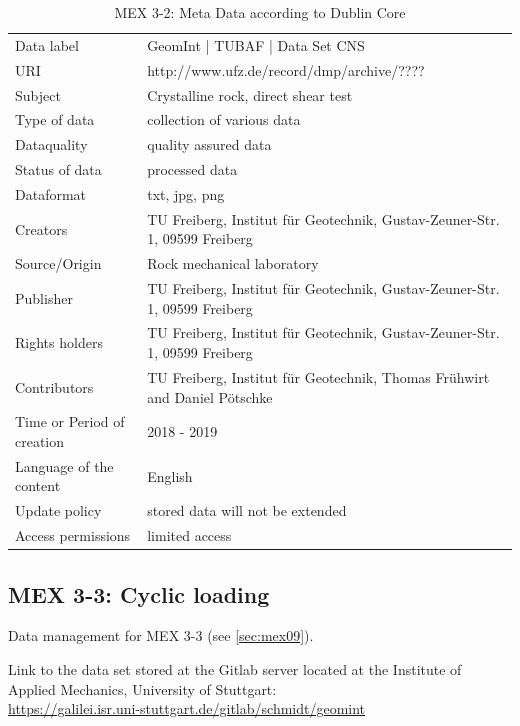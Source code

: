 \begin{table}[h!]
\caption{MEX 3-2: Meta Data according to Dublin Core}
\label{tab:}
\small
\begin{tabular}{R{3cm}|L{7cm}}
\hline
%
Data label & GeomInt | TUBAF | Data Set CNS \\
URI & http://www.ufz.de/record/dmp/archive/???? \\
Subject  & Crystalline rock, direct shear test \\
Type of data  & collection of various data \\
Dataquality  & quality assured data \\
Status of data  & processed data \\
Dataformat  & txt, jpg, png \\
Creators  & TU Freiberg, Institut für Geotechnik, Gustav-Zeuner-Str. 1, 09599 Freiberg \\
Source/Origin  & Rock mechanical laboratory \\
Publisher  & TU Freiberg, Institut für Geotechnik, Gustav-Zeuner-Str. 1, 09599 Freiberg \\
Rights holders  & TU Freiberg, Institut für Geotechnik, Gustav-Zeuner-Str. 1, 09599 Freiberg \\
Contributors  & TU Freiberg, Institut für Geotechnik, Thomas Fr\"uhwirt and Daniel P\"otschke \\
Time or Period of creation  & 2018 - 2019 \\
Language of the content & English \\
Update policy  & stored data will not be extended \\
Access permissions  & limited access \\
%
\hline
\end{tabular}
\end{table}


\subsection{MEX 3-3: Cyclic loading}

Data management for MEX 3-3 (see \ref{sec:mex09}).

Link to the data set stored at the Gitlab server located at the Institute of Applied Mechanics, University of Stuttgart:\\
\hyperlink{https://galilei.isr.uni-stuttgart.de/gitlab/schmidt/geomint}{https://galilei.isr.uni-stuttgart.de/gitlab/schmidt/geomint}\\


